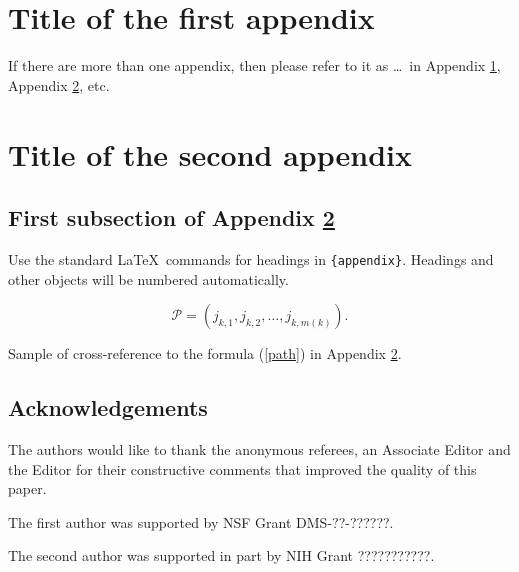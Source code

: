\documentclass[aoas]{imsart}
\numberwithin{equation}{section}
\theoremstyle{plain}
\theoremstyle{remark}
\begin{document}
\begin{appendix}

\hypertarget{appA}{%
\section{Title of the first appendix}\label{appA}}

If there are more than one appendix, then please refer to it as
\ldots~in Appendix \ref{appA}, Appendix \ref{appB}, etc.

\hypertarget{appB}{%
\section{Title of the second appendix}\label{appB}}

\hypertarget{first-subsection-of-appendix}{%
\subsection{\texorpdfstring{First subsection of Appendix
\protect\ref{appB}}{First subsection of Appendix }}\label{first-subsection-of-appendix}}

Use the standard \LaTeX~commands for headings in \verb|{appendix}|.
Headings and other objects will be numbered automatically.

\begin{equation}
\mathcal{P}=(j_{k,1},j_{k,2},\dots,j_{k,m(k)}). \label{path}
\end{equation}

Sample of cross-reference to the formula (\ref{path}) in Appendix
\ref{appB}.

\end{appendix}

\hypertarget{acknowledgements}{%
\subsection*{Acknowledgements}\label{acknowledgements}}

The authors would like to thank the anonymous referees, an Associate
Editor and the Editor for their constructive comments that improved the
quality of this paper.

The first author was supported by NSF Grant DMS-??-??????.

The second author was supported in part by NIH Grant ???????????.

\begin{supplement}
\end{supplement}
\begin{supplement}
\end{supplement}



\end{document}
